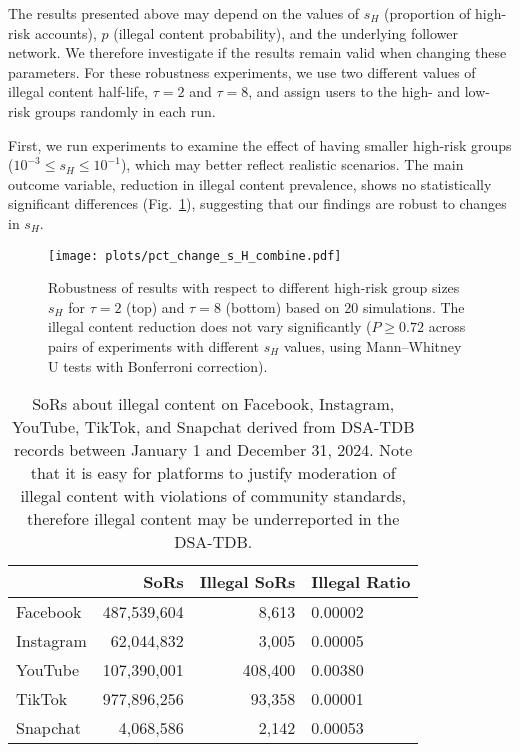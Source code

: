 \documentclass{article}
\begin{document}
The results presented above may depend on the values of $s_H$ (proportion of high-risk accounts), $p$ (illegal content probability), and the underlying follower network. 
We therefore investigate if the results remain valid when changing these parameters. For these robustness experiments, we use two different values of illegal content half-life, $\tau=2$ and $\tau=8$, and assign users to the high- and low-risk groups randomly in each run. 

First, we run experiments to examine the effect of having smaller high-risk groups ($10^{-3} \le s_H \le 10^{-1}$), which may better reflect realistic scenarios. 
The main outcome variable, reduction in illegal content prevalence, shows no statistically significant differences (Fig.~\ref{fig:s_H}), suggesting that our findings are robust to changes in $s_H$. 

\begin{figure}
\centering
\texttt{[image: plots/pct\_change\_s\_H\_combine.pdf]}
\caption{Robustness of results with respect to different high-risk group sizes $s_H$  for $\tau=2$ (top) and $\tau=8$ (bottom) based on 20 simulations. The illegal content reduction does not vary significantly ($P \ge 0.72$ across pairs of experiments with different $s_H$ values, using Mann–Whitney U tests with Bonferroni correction).}
\label{fig:s_H}
\end{figure}

\begin{table}
\centering
\caption{SoRs about illegal content on Facebook, Instagram, YouTube, TikTok, and Snapchat derived from DSA-TDB records between January 1 and December 31, 2024. Note that it is easy for platforms to justify moderation of illegal content with violations of community standards, therefore illegal content may be underreported in the DSA-TDB.}
\begin{tabular}{lrrl}
\hline
 & SoRs& Illegal SoRs& Illegal Ratio \\
\hline
Facebook & 487,539,604 & 8,613 & 0.00002 \\
Instagram & 62,044,832 & 3,005 & 0.00005 \\
YouTube & 107,390,001 & 408,400 & 0.00380 \\
TikTok & 977,896,256 & 93,358 & 0.00001 \\
Snapchat & 4,068,586 & 2,142 & 0.00053 \\
\hline
\end{tabular}
\label{table:dsa_illegalprob}
\end{table}
\end{document}
